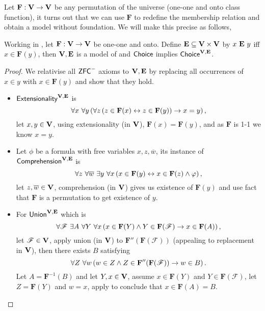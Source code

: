 \newcommand*{\F}{\mathbf{F}}
Let \(\mathbf{F}:\mathbf{V}\to\mathbf{V}\) be any permutation of the universe (one-one and onto class function),
it turns out that we can use \(\mathbf{F}\) to redefine the membership relation and obtain a model without foundation.
We will make this precise as follows,
\begin{lemma} %
    \label{KunenC4E18}
    Working in \ZFminus, let \(\mathbf{F}:\mathbf{V}\to\mathbf{V}\) be one-one and onto.
    Define \(\mathbf{E}\subseteq \mathbf{V}\times\mathbf{V}\) by \(x\ \mathbf{E}\ y\) iff \(x\in \mathbf{F}(y)\),
    then \(\mathbf{V},\mathbf{E}\) is a model of \ZFminus
    and \({\normalfont\textsf{Choice}}\) implies \({\normalfont\textsf{Choice}}^{\mathbf{V},\mathbf{E}}\).
\end{lemma}
\begin{proof}
    We relativise all \(\mbox{\normalfont \textsf{ZFC}}^-\) axioms to \(\mathbf{V},\mathbf{E}\) by replacing all occurrences of \(x\in y\) with \(x\in \F(y)\)
    and show that they hold.
    \begin{itemize}
        \item \(\textsf{Extensionality}^{\mathbf{V},\mathbf{E}}\) is
            \[ \forall x~\forall y \paren{
                    \forall z \paren{z\in \F(x) \leftrightarrow z\in \F(y)} \rightarrow x = y
            },\]
            let \(x, y\in \mathbf{V}\), using extensionality (in \(\mathbf{V}\)), \(\F(x) = \F(y)\), and as \(\F\) is 1-1 we know \(x = y\).

        \item Let \(\phi\) be a formula with free variables \(x,z,\overline{w}\), its instance of \(\textsf{Comprehension}^{\mathbf{V},\mathbf{E}}\) is
            \[ \forall z~\forall \overline{w}~\exists y~\forall x \paren{
                    x \in \F(y) \leftrightarrow x\in \F(z) \land \phi
            },\]
            let \(z,\overline{w}\in \mathbf{V}\), comprehension (in \(\mathbf{V}\)) gives us existence of \(\F(y)\) and use fact that \(\F\) is a permutation to get existence of \(y\).

        \item For \(\textsf{Union}^{\mathbf{V},\mathbf{E}}\) which is
            \[
                \forall \mathscr{F}~\exists A~\forall Y~\forall x\paren{x\in \F(Y)\land Y\in\F(\mathscr{F}) \rightarrow x\in\F(A)},
            \]
            let \(\mathscr{F}\in\mathbf{V}\),
            apply union (in \(\mathbf{V}\)) to \(\F''(\F(\mathscr{F}))\) (appealing to replacement in \(\mathbf{V}\)),
            then there exists \(B\) satisfying
            \begin{equation}\label{c2:eqn:union}
                \forall Z~\forall w\paren{w\in Z\land Z\in \F''(\F(\mathscr{F})) \rightarrow w\in B}.
            \end{equation}
            Let \(A = \F^{-1}(B)\) and let \(Y,x\in\mathbf{V}\), assume \(x\in \F(Y)\) and \(Y\in\F(\mathscr{F})\),
            let \(Z = \F(Y)\) and \(w = x\), apply  to conclude that \(x\in \F(A) = B\).


\end{itemize}
\end{proof}
